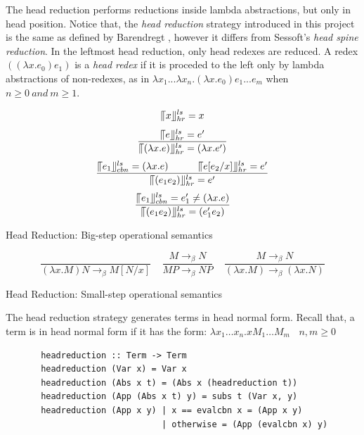 The head reduction performs reductions inside lambda abstractions, but only in head position. Notice that, the \textit{head reduction} strategy introduced in this project is the same as defined by Barendregt \cite{barendregt1984lambda}, however it differs from Sessoft's \cite{sestoft2002demonstrating} \textit{head spine reduction}. In the leftmost head reduction, only head redexes are reduced. A redex $((\lambda x.e_0)e_1)$ is a \textit{head redex} if it is proceded to the left only by lambda abstractions of non-redexes, as in $\lambda x_1...\lambda x_n.(\lambda x.e_0)e_1...e_m$ when $n \geqslant 0\ and\ m \geqslant 1$.


\begin{equation*}
\llceil x \rrfloor ^{ls} _{hr} = x
\end{equation*}
\begin{equation*}
\frac{\llceil e \rrfloor ^{ls} _{hr} = e'}{\llceil (\lambda x.e) \rrfloor ^{ls} _{hr} = (\lambda x.e')}
\end{equation*}
\begin{equation*}
\frac{\llceil e_1 \rrfloor ^{ls} _{cbn} = (\lambda x.e)\ \ \ \ \ \ \ \ \ \llceil e[e_2/x] \rrfloor ^{ls} _{hr} = e'}{\llceil (e_1e_2) \rrfloor ^{ls} _{hr} = e'}
\end{equation*}
\begin{equation*}
\frac{\llceil e_1 \rrfloor ^{ls} _{cbn} = e'_1\neq (\lambda x.e)}{\llceil (e_1e_2) \rrfloor ^{ls} _{hr}  = (e'_1e_2)}
\end{equation*}
\begin{center}
Head Reduction: Big-step operational semantics
\end{center}


\begin{equation*}
\frac{}{(\lambda x.M)N \rightarrow _\beta M[N/x]}\ \ \ \ \  
\frac{M \rightarrow _\beta N}{MP \rightarrow _\beta NP}\ \ \ \ \ 
\frac{M \rightarrow _\beta N}{(\lambda x.M) \rightarrow _\beta (\lambda x.N)}
\end{equation*}
\begin{center}
Head Reduction: Small-step operational semantics
\end{center}

The head reduction strategy generates terms in head normal form. Recall that, a term is in head normal form if it has the form: $\lambda x_1\ldots x_n.xM_1\ldots M_m\ \ \ \ n,m\geqslant 0$

\begin{verbatim}
       headreduction :: Term -> Term
       headreduction (Var x) = Var x
       headreduction (Abs x t) = (Abs x (headreduction t))
       headreduction (App (Abs x t) y) = subs t (Var x, y)
       headreduction (App x y) | x == evalcbn x = (App x y)
                               | otherwise = (App (evalcbn x) y)  
\end{verbatim}

